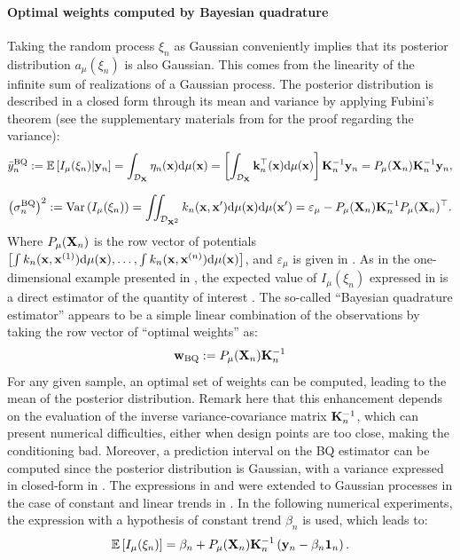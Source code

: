 \paragraph{Optimal weights computed by Bayesian quadrature}%
Taking the random process $\xi_n$ as Gaussian conveniently implies that its posterior distribution $a_\mu(\xi_n)$ is also Gaussian. 
This comes from the linearity of the infinite sum of realizations of a Gaussian process. 
The posterior distribution is described in a closed form through its mean and variance by applying Fubini's theorem (see the supplementary materials from \cite{briol_oates_2019} for the proof regarding the variance): %
\begin{equation}
     \bar{y}_n^{\mathrm{BQ}} := \mathbb{E}\left[I_{\mu}(\xi_n) | {\bf y}_n \right] 
     = \int_{\mathcal{D}_{\bf X}} \eta_n({\bf x}) \mathrm{d} \mu({\bf x})
     = \left[\int_{\mathcal{D}_{\bf X}} {\bf k}_n^\top({\bf x}) \mathrm{d} \mu({\bf x}) \right] {\bf K}_n^{-1} {\bf y}_n
     = P_\mu({\bf X}_n) {\bf K}_n^{-1} {\bf y}_n,       
\label{eq:mean_post}
\end{equation}

\begin{equation}
    \left(\sigma_n^{\mathrm{BQ}}\right)^2 := \operatorname{Var}\left(I_{\mu}(\xi_n) \right) 
    = \iint_{\mathcal{D}_{{\bf X}^2}} k_n({\bf x}, {\bf x}') \mathrm{d} \mu({\bf x}) \mathrm{d} \mu({\bf x}') 
    = \varepsilon_\mu - P_\mu({\bf X}_n) {\bf K}_n^{-1} P_\mu({\bf X}_n)^\top.
\label{eq:var_post}
\end{equation}
\noindent
Where $P_\mu({\bf X}_n)$ is the row vector of potentials $\left[\int k_n({\bf x}, {\bf x}^{(1)}) \mathrm{d} \mu({\bf x}), \dots, \int k_n({\bf x}, {\bf x}^{(n)}) \mathrm{d} \mu({\bf x})\right]$, and $\varepsilon_\mu$ is given in . 
As in the one-dimensional example presented in , the expected value of $I_{\mu}(\xi_n)$ expressed in  is a direct estimator of the quantity of interest . 
The so-called ``Bayesian quadrature estimator'' appears to be a simple linear combination of the observations by taking the row vector of ``optimal weights'' as: 
\begin{equation}
    \mathbf{w}_{\mathrm{BQ}} := P_\mu({\bf X}_n) {\bf K}_n^{-1}
    \label{eq:bq_weights}
\end{equation}
For any given sample, an optimal set of weights can be computed, leading to the mean of the posterior distribution. 
Remark here that this enhancement depends on the evaluation of the inverse variance-covariance matrix ${\bf K}_n^{-1}$, which can present numerical difficulties, either when design points are too close, making the conditioning bad. 
Moreover, a prediction interval on the BQ estimator can be computed since the posterior distribution is Gaussian, with a variance expressed in closed-form in . 
The expressions in  and  were extended to Gaussian processes in the case of constant and linear trends in \cite{pronzato_zhigljavsky_2020}. 
In the following numerical experiments, the expression with a hypothesis of constant trend $\beta_n$ is used, which leads to:
\begin{equation}
     \mathbb{E}\left[I_{\mu}(\xi_n)\right] = \beta_n + P_\mu({\bf X}_n) {\bf K}_n^{-1} \left({\bf y}_n - \beta_n \mathbf{1}_n \right).
     \label{eq:mean_post_cst}
\end{equation}

